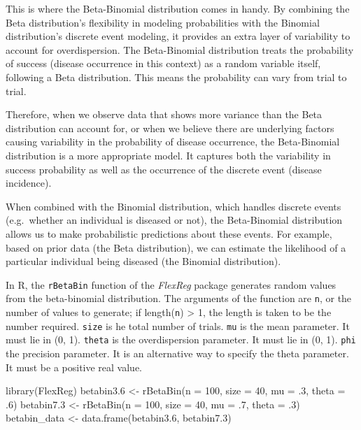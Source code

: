 \documentclass[
  letterpaper,
]{book}
\newenvironment{Shaded}{\begin{snugshade}}{\end{snugshade}}
\newcommand{\AttributeTok}[1]{\textcolor[rgb]{0.40,0.45,0.13}{#1}}
\newcommand{\DecValTok}[1]{\textcolor[rgb]{0.68,0.00,0.00}{#1}}
\newcommand{\FloatTok}[1]{\textcolor[rgb]{0.68,0.00,0.00}{#1}}
\newcommand{\FunctionTok}[1]{\textcolor[rgb]{0.28,0.35,0.67}{#1}}
\newcommand{\NormalTok}[1]{\textcolor[rgb]{0.00,0.23,0.31}{#1}}
\newcommand{\OtherTok}[1]{\textcolor[rgb]{0.00,0.23,0.31}{#1}}
\begin{document}
This is where the Beta-Binomial distribution comes in handy. By
combining the Beta distribution's flexibility in modeling probabilities
with the Binomial distribution's discrete event modeling, it provides an
extra layer of variability to account for overdispersion. The
Beta-Binomial distribution treats the probability of success (disease
occurrence in this context) as a random variable itself, following a
Beta distribution. This means the probability can vary from trial to
trial.

Therefore, when we observe data that shows more variance than the Beta
distribution can account for, or when we believe there are underlying
factors causing variability in the probability of disease occurrence,
the Beta-Binomial distribution is a more appropriate model. It captures
both the variability in success probability as well as the occurrence of
the discrete event (disease incidence).

When combined with the Binomial distribution, which handles discrete
events (e.g.~whether an individual is diseased or not), the
Beta-Binomial distribution allows us to make probabilistic predictions
about these events. For example, based on prior data (the Beta
distribution), we can estimate the likelihood of a particular individual
being diseased (the Binomial distribution).

In R, the \texttt{rBetaBin} function of the \emph{FlexReg} package
generates random values from the beta-binomial distribution. The
arguments of the function are \texttt{n}, or the number of values to
generate; if length(\texttt{n}) \textgreater{} 1, the length is taken to
be the number required. \texttt{size} is he total number of trials.
\texttt{mu} is the mean parameter. It must lie in (0, 1). \texttt{theta}
is the overdispersion parameter. It must lie in (0, 1). \texttt{phi} the
precision parameter. It is an alternative way to specify the theta
parameter. It must be a positive real value.

\begin{Shaded}
\begin{Highlighting}[]
\FunctionTok{library}\NormalTok{(FlexReg) }
\NormalTok{betabin3}\FloatTok{.6} \OtherTok{\textless{}{-}} \FunctionTok{rBetaBin}\NormalTok{(}\AttributeTok{n =} \DecValTok{100}\NormalTok{, }\AttributeTok{size =} \DecValTok{40}\NormalTok{, }\AttributeTok{mu =}\NormalTok{ .}\DecValTok{3}\NormalTok{, }\AttributeTok{theta =}\NormalTok{ .}\DecValTok{6}\NormalTok{)}
\NormalTok{betabin7}\FloatTok{.3} \OtherTok{\textless{}{-}} \FunctionTok{rBetaBin}\NormalTok{(}\AttributeTok{n =} \DecValTok{100}\NormalTok{, }\AttributeTok{size =} \DecValTok{40}\NormalTok{, }\AttributeTok{mu =}\NormalTok{ .}\DecValTok{7}\NormalTok{, }\AttributeTok{theta =}\NormalTok{ .}\DecValTok{3}\NormalTok{)}
\NormalTok{betabin\_data }\OtherTok{\textless{}{-}} \FunctionTok{data.frame}\NormalTok{(betabin3}\FloatTok{.6}\NormalTok{, betabin7}\FloatTok{.3}\NormalTok{)}
\end{Highlighting}
\end{Shaded}
\end{document}
